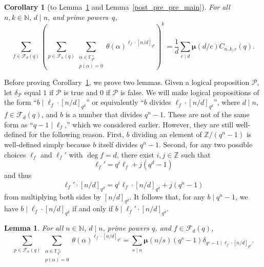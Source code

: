 \documentclass[10pt]{article}
\newtheorem{lemma}[theorem]{Lemma}
\newtheorem{corollary}[theorem]{Corollary}
\theoremstyle{definition}
\newcommand{\F}{\mathbb{F}}
\newcommand{\CF}{\mathcal{F}}
\newcommand{\N}{\mathbb{N}}
\newcommand{\CP}{\mathcal{P}}
\newcommand{\Z}{\mathbb{Z}}
\newcommand{\moebius}{\pmb{\mu}}
\newcommand{\te}{\theta}
\begin{document}
\begin{corollary}[to Lemma~\ref{pre_pre_main} and Lemma~\ref{post_pre_pre_main}]
\label{pre_main}
For all \(n,k \in \N, \, d \mid n\), and prime powers~\(q\),
\[
\sum_{f \in \CF_d (q)}
\left (
\sum_{p \in \CF_n (q)}
\sum_{\substack{\alpha \in \F_{q^n}^\times \\ p(\alpha) = 0}}
\te(\alpha)^{\ell_f \cdot [n/d]_{q^d}}
\right )^k
=
\frac{1}{d} \sum_{c \mid d} \moebius(d/c) C_{n,k,c}(q).
\]
\end{corollary}




Before proving Corollary~\ref{pre_main}, we prove two lemmas.
Given a logical proposition \(\CP\), let \(\delta_\CP\) equal \(1\) if \(\CP\) is true and \(0\) if \(\CP\) is false.
We will make logical propositions of the form ``\(b \mid \ell_f \cdot [n/d]_{q^d}\)'' or equivalently ``\(b\) divides \(\ell_f \cdot [n/d]_{q^d}\)'', where \(d \mid n\), \(f \in \CF_d (q)\), and \(b\) is a number that divides \(q^n-1\).
These are not of the same form as ``\(q-1 \mid \ell_f\),'' which we considered earlier.
However, they are still well-defined for the following reason.
First, \(b\) dividing an element of \(\Z / (q^n-1)\) is well-defined simply because \(b\) itself divides \(q^n-1\).
Second, for any two possible choices \(\ell_f\) and \(\ell_f'\) with \(\deg f = d\), there exist \(i,j \in \Z\) such that
\begin{equation}
\label{well_defined_div}
\ell_f' = q^i \ell_f + j(q^d-1)
\end{equation}
and thus
\begin{equation}
\ell_f' \cdot [n/d]_{q^d} = q^i \ell_f \cdot [n/d]_{q^d} + j (q^n-1)
\end{equation}
from multiplying both sides by \([n/d]_{q^d}\).
It follows that, for any \(b \mid q^n-1\), we have
\(b \mid \ell_f \cdot [n/d]_{q^d}\)
if and only if
\(b \mid \ell_f' \cdot [n/d]_{q^d}\).



\begin{lemma}
\label{pre_pre_main}
For all \(n \in \N\), \(d \mid n\), prime powers \(q\), and \(f \in \CF_d (q)\),
\begin{equation}
\sum_{p \in \CF_n (q)}
\sum_{\substack{\alpha \in \F_{q^n}^\times \\ p(\alpha) = 0}}
\te(\alpha)^{\ell_f \cdot [n/d]_{q^d}}
=
\sum_{s \mid n} \moebius(n/s) (q^s-1) \delta_{q^s - 1 \mid \ell_f \cdot [n/d]_{q^d}}.
\end{equation}
\end{lemma}
\end{document}
